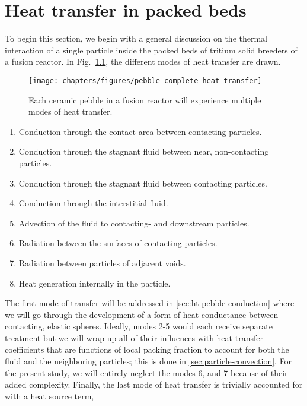 \chapter{Heat transfer in packed beds} \label{sec:modeling-heat-transfer}
To begin this section, we begin with a general discussion on the thermal interaction of a single particle inside the packed beds of tritium solid breeders of a fusion reactor. In Fig.~\ref{fig:peb-comp-ht}, the different modes of heat transfer are drawn.

\begin{figure}[t]
	\centering
	\caption{Each ceramic pebble in a fusion reactor will experience multiple modes of heat transfer.}
	\texttt{[image: chapters/figures/pebble-complete-heat-transfer]}\label{fig:peb-comp-ht}
\end{figure}



\begin{enumerate}
\item Conduction through the contact area between contacting particles.
\item Conduction through the stagnant fluid between near, non-contacting particles.
\item Conduction through the stagnant fluid between contacting particles.
\item Conduction through the interstitial fluid. 
\item Advection of the fluid to contacting- and downstream particles.
\item Radiation between the surfaces of contacting particles.
\item Radiation between particles of adjacent voids.
\item Heat generation internally in the particle.
\end{enumerate}

The first mode of transfer will be addressed in \cref{sec:ht-pebble-conduction} where we will go through the development of a form of heat conductance between contacting, elastic spheres. Ideally, modes 2-5 would each receive separate treatment but we will wrap up all of their influences with heat transfer coefficients that are functions of local packing fraction to account for both the fluid and the neighboring particles; this is done in \cref{sec:particle-convection}. For the present study, we will entirely neglect the modes 6, and 7 because of their added complexity. Finally, the last mode of heat transfer is trivially accounted for with a heat source term,

